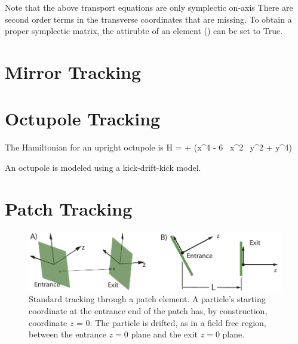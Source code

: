 Note that the above transport equations are only symplectic on-axis
There are second order terms in the transverse coordinates that are
missing. To obtain a proper symplectic matrix, the 
attirubte of an  element () can be set to
True.

\section{Mirror Tracking}
\label{s:mirror.std}

\section{Octupole Tracking}
\label{s:octupole.std}

The Hamiltonian for an upright octupole is
\Begineq
  H =  +  (x^4 - 6 \, x^2 \, y^2 + y^4)
\Endeq

An octupole is modeled using a kick-drift-kick model.

\section{Patch Tracking}
\label{s:patch.std}

\begin{figure}[tb]
  \centering
  \includegraphics[width=5in]{patch.pdf}
  \caption[Standard patch transformation.]
{Standard tracking through a patch element. A particle's starting coordinate at
the entrance end of the patch has, by construction, coordinate $z$ =
0. The particle is drifted, as in a field free region, between the
entrance $z = 0$ plane and the exit $z = 0$ plane.}
  \label{f:patch.track}
\end{figure}

